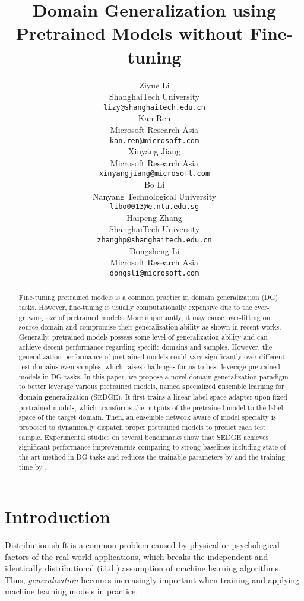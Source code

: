 \documentclass{article}
\title{Domain Generalization using Pretrained Models without Fine-tuning}
\author{Ziyue Li\\
ShanghaiTech University\\
  \texttt{lizy@shanghaitech.edu.cn} \\
\And
   Kan Ren \\
   Microsoft Research Asia \\
   \texttt{kan.ren@microsoft.com} \\
   \AND
   Xinyang Jiang \\
   Microsoft Research Asia \\
   \texttt{xinyangjiang@microsoft.com} \\
   \And
   Bo Li \\
   Nanyang Technological University\\
   \texttt{libo0013@e.ntu.edu.sg} \\
   \And
   Haipeng Zhang \\
   ShanghaiTech University\\
   \texttt{zhanghp@shanghaitech.edu.cn} \\
   \And
   Dongsheng Li \\
   Microsoft Research Asia \\
   \texttt{dongsli@microsoft.com} \\
}
\begin{document}
\maketitle

\begin{abstract}
Fine-tuning pretrained models is a common practice in domain generalization (DG) tasks. 
However, fine-tuning is usually computationally expensive due to the ever-growing size of pretrained models. More importantly, it may cause over-fitting on source domain and compromise their generalization ability as shown in recent works. 
Generally, pretrained models possess some level of generalization ability and can achieve decent performance regarding specific domains and samples. 
However, the generalization performance of pretrained models 
could vary significantly over different test domains even samples, which raises challenges for us to best leverage pretrained models in DG tasks. 
In this paper, we propose a novel domain generalization paradigm to better leverage various pretrained models, named {\bf s}pecialized {\bf e}nsemble learning for {\bf d}omain {\bf ge}neralization (SEDGE). 
It first trains a linear label space adapter upon fixed pretrained models, which transforms the outputs of the pretrained model to the label space of the target domain.
Then, an ensemble network aware of model specialty is proposed to dynamically dispatch proper pretrained models to predict each test sample.
Experimental studies on several benchmarks show that SEDGE achieves significant performance improvements 
comparing to strong baselines including state-of-the-art method in DG tasks 
and reduces the trainable parameters by  and the training time by .



\end{abstract}

\section{Introduction}

Distribution shift is a common problem 
caused by physical or psychological factors of the real-world applications, which breaks the independent and identically distributional (i.i.d.) assumption of machine learning algorithms.
Thus, \textit{generalization} becomes increasingly important when training and applying machine learning models in practice.
\end{document}
